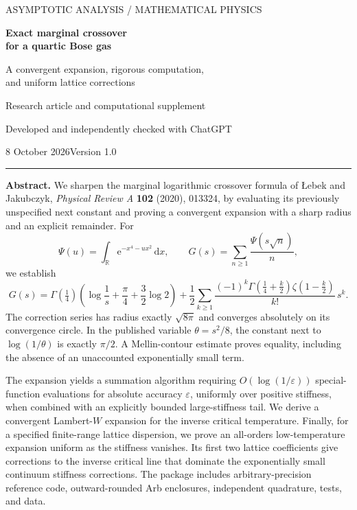 \documentclass[11pt,a4paper]{article}
\numberwithin{equation}{section}
\theoremstyle{definition}
\newcommand{\R}{\mathbb R}
\newcommand{\dd}{\,\mathrm d}
\newcommand{\e}{\mathrm e}
\newcommand{\gfour}{\Gamma(\tfrac14)}
\begin{document}
\hypersetup{pageanchor=false}
\begin{titlepage}
\thispagestyle{empty}
\vspace*{2mm}
{\sffamily\small\color{teal}ASYMPTOTIC ANALYSIS \quad / \quad MATHEMATICAL PHYSICS\par}
\vspace{6mm}
{\fontsize{29}{34}\selectfont\bfseries\color{navy}Exact marginal crossover\\[3mm]for a quartic Bose gas\par}
\vspace{7mm}
{\Large A convergent expansion, rigorous computation,\\[1mm]
and uniform lattice corrections\par}
\vspace{6mm}
{\large Research article and computational supplement\par}
\vspace{2mm}
{\color{muted}Developed and independently checked with ChatGPT\par}
{\color{muted}8 October 2026\quad\textbullet\quad Version 1.0\par}
\vspace{6mm}
\hrule
\vspace{6mm}
\noindent\small\textbf{Abstract.}
We sharpen the marginal logarithmic crossover formula of Łebek and
Jakubczyk, \emph{Physical Review A} \textbf{102} (2020), 013324,
by evaluating its previously unspecified next constant and proving a
convergent expansion with a sharp radius and an explicit remainder.
For
\[
 \Psi(u)=\int_{\R}\e^{-x^4-u x^2}\dd x,
 \qquad G(s)=\sum_{n\ge1}\frac{\Psi(s\sqrt n)}n,
\]
we establish
\[
 G(s)=\gfour\left(\log\frac1s+\frac\pi4+\frac32\log2\right)
 +\frac12\sum_{k\ge1}\frac{(-1)^k\Gamma(\frac14+\frac k2)
 \zeta(1-\frac k2)}{k!}\,s^k.
\]
The correction series has radius exactly $\sqrt{8\pi}$ and converges
absolutely on its convergence circle. In the published variable
$\theta=s^2/8$, the constant next to $\log(1/\theta)$ is exactly
$\pi/2$. A Mellin-contour estimate proves equality, including the
absence of an unaccounted exponentially small term.

The expansion yields a summation algorithm requiring
$O(\log(1/\varepsilon))$ special-function evaluations for absolute
accuracy $\varepsilon$, uniformly over positive stiffness, when combined
with an explicitly bounded large-stiffness tail. We derive a convergent
Lambert-$W$ expansion for the inverse critical temperature. Finally,
for a specified finite-range lattice dispersion, we prove an all-orders
low-temperature expansion uniform as the stiffness vanishes. Its first
two lattice coefficients give corrections to the inverse critical line
that dominate the exponentially small continuum stiffness corrections.
The package includes arbitrary-precision reference code,
outward-rounded Arb enclosures, independent quadrature, tests, and data.


\end{titlepage}
\end{document}
